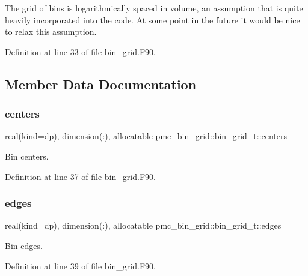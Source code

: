 The grid of bins is logarithmically spaced in volume, an assumption that is quite heavily incorporated into the code. At some point in the future it would be nice to relax this assumption. 

Definition at line 33 of file bin\+\_\+grid.\+F90.



\subsection{Member Data Documentation}
\mbox{\label{structpmc__bin__grid_1_1bin__grid__t_a314c495872c7e6a83b2eb29ad5c79465}} 
\subsubsection{\texorpdfstring{centers}{centers}}
{\footnotesize\ttfamily real(kind=dp), dimension(\+:), allocatable pmc\+\_\+bin\+\_\+grid\+::bin\+\_\+grid\+\_\+t\+::centers}



Bin centers. 



Definition at line 37 of file bin\+\_\+grid.\+F90.

\mbox{\label{structpmc__bin__grid_1_1bin__grid__t_a58dccaaaebf7a11a60cf46848e39a7a8}} 
\subsubsection{\texorpdfstring{edges}{edges}}
{\footnotesize\ttfamily real(kind=dp), dimension(\+:), allocatable pmc\+\_\+bin\+\_\+grid\+::bin\+\_\+grid\+\_\+t\+::edges}



Bin edges. 



Definition at line 39 of file bin\+\_\+grid.\+F90.

\mbox{\label{structpmc__bin__grid_1_1bin__grid__t_a45f1d8ea9689e3db3f872d72c9ec35d8}} 
